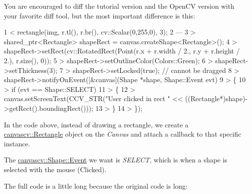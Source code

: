 You are encouraged to diff the tutorial version and the Open\+CV version with your favorite diff tool, but the most important difference is this\+:


\begin{DoxyCode}
1 <         rectangle(img, r.tl(), r.br(), cv::Scalar(0,255,0), 3);
2 ---
3 >         shared\_ptr<Rectangle> shapeRect = canvas.createShape<Rectangle>();
4 >         shapeRect->setRect(cv::RotatedRect(Point(r.x + r.width / 2., r.y + r.height / 2.), r.size(), 0));
5 >         shapeRect->setOutlineColor(Colors::Green);
6 >         shapeRect->setThickness(3);
7 >         shapeRect->setLocked(true); // cannot be dragged
8 >         shapeRect->notifyOnEvent([&canvas](Shape *shape, Shape::Event evt)
9 >         \{
10 >             if (evt == Shape::SELECT)
11 >             \{
12 >                 canvas.setScreenText(CCV\_STR("User clicked in rect " <<
       ((Rectangle*)shape)->getRect().boundingRect()));
13 >             \}
14 >         \});
\end{DoxyCode}


In the code above, instead of drawing a rectangle, we create a \hyperlink{classcanvascv_1_1Rectangle}{canvascv\+::\+Rectangle} object on the {\itshape Canvas} and attach a callback to that specific instance.

The \hyperlink{classcanvascv_1_1Shape_a3fa381d7be3c6bb3cd736e237a444d5c}{canvascv\+::\+Shape\+::\+Event} we want is {\itshape S\+E\+L\+E\+CT}, which is when a shape is selected with the mouse (Clicked).

The full code is a little long because the original code is long\+:


